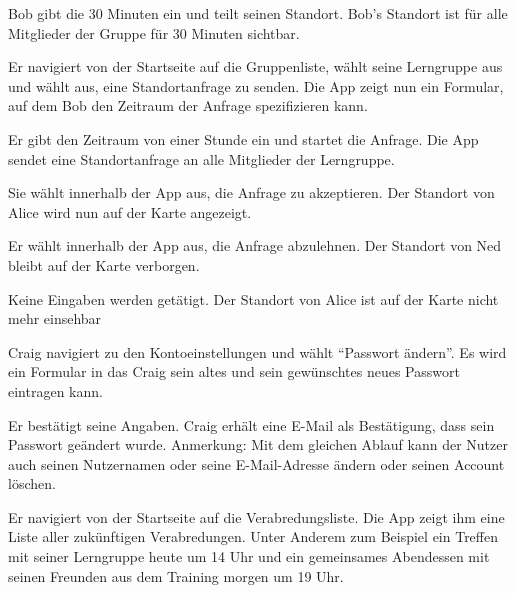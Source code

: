 \documentclass[parskip=full,11pt]{scrartcl}
\begin{document}
{Bob gibt die 30 Minuten ein und teilt seinen Standort.}
{Bob's Standort ist für alle Mitglieder der Gruppe für 30 Minuten sichtbar.}


{Er navigiert von der Startseite auf die Gruppenliste, wählt seine Lerngruppe aus und wählt aus, eine Standortanfrage zu senden.}
{Die App zeigt nun ein Formular, auf dem Bob den Zeitraum der Anfrage spezifizieren kann.}

{Er gibt den Zeitraum von einer Stunde ein und startet die Anfrage.}
{Die App sendet eine Standortanfrage an alle Mitglieder der Lerngruppe.}

{Sie wählt innerhalb der App aus, die Anfrage zu akzeptieren.}
{Der Standort von Alice wird nun auf der Karte angezeigt.}

{Er wählt innerhalb der App aus, die Anfrage abzulehnen.}
{Der Standort von Ned bleibt auf der Karte verborgen.}

{Keine Eingaben werden getätigt.}
{Der Standort von Alice ist auf der Karte nicht mehr einsehbar}


{Craig navigiert zu den Kontoeinstellungen und wählt \enquote{Passwort ändern}.}
{Es wird ein Formular in das Craig sein altes und sein gewünschtes neues Passwort eintragen kann.}

{Er bestätigt seine Angaben.}
{Craig erhält eine E-Mail als Bestätigung, dass sein Passwort geändert wurde.}
Anmerkung: Mit dem gleichen Ablauf kann der Nutzer auch seinen Nutzernamen oder seine
E-Mail-Adresse ändern oder seinen Account löschen.



{Er navigiert von der Startseite auf die Verabredungsliste.}
{Die App zeigt ihm eine Liste aller zukünftigen Verabredungen.
Unter Anderem zum Beispiel ein Treffen mit seiner Lerngruppe heute um 14 Uhr
und ein gemeinsames Abendessen mit seinen Freunden aus dem Training morgen um 19 Uhr.}
\end{document}
